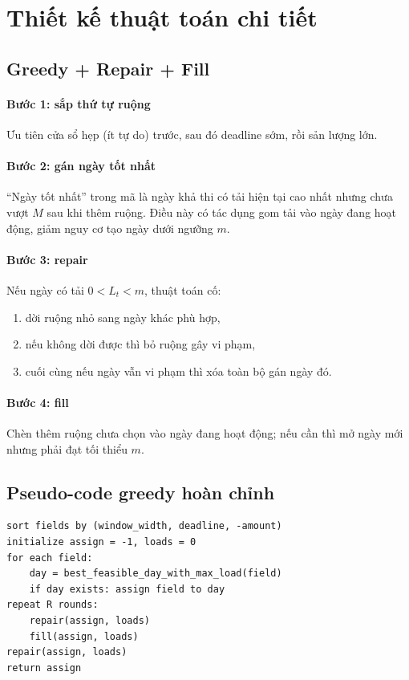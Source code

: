 \documentclass[12pt,a4paper]{article}
\begin{document}
\section{Thiết kế thuật toán chi tiết}
\subsection{Greedy + Repair + Fill}
\paragraph{Bước 1: sắp thứ tự ruộng}
Ưu tiên cửa sổ hẹp (ít tự do) trước, sau đó deadline sớm, rồi sản lượng lớn.

\paragraph{Bước 2: gán ngày tốt nhất}
``Ngày tốt nhất'' trong mã là ngày khả thi có tải hiện tại cao nhất nhưng chưa vượt $M$ sau khi thêm ruộng.
Điều này có tác dụng gom tải vào ngày đang hoạt động, giảm nguy cơ tạo ngày dưới ngưỡng $m$.

\paragraph{Bước 3: repair}
Nếu ngày có tải $0 < L_t < m$, thuật toán cố:
\begin{enumerate}
  \item dời ruộng nhỏ sang ngày khác phù hợp,
  \item nếu không dời được thì bỏ ruộng gây vi phạm,
  \item cuối cùng nếu ngày vẫn vi phạm thì xóa toàn bộ gán ngày đó.
\end{enumerate}

\paragraph{Bước 4: fill}
Chèn thêm ruộng chưa chọn vào ngày đang hoạt động; nếu cần thì mở ngày mới nhưng phải đạt tối thiểu $m$.

\subsection{Pseudo-code greedy hoàn chỉnh}
\begin{lstlisting}
sort fields by (window_width, deadline, -amount)
initialize assign = -1, loads = 0
for each field:
    day = best_feasible_day_with_max_load(field)
    if day exists: assign field to day
repeat R rounds:
    repair(assign, loads)
    fill(assign, loads)
repair(assign, loads)
return assign
\end{lstlisting}
\end{document}
